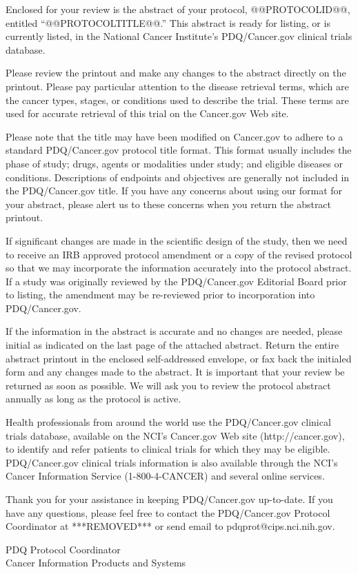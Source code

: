 \documentclass[letterpaper,12pt]{letter}
\begin{document}
Enclosed for your review is the abstract of your protocol, @@PROTOCOLID@@,
entitled ``@@PROTOCOLTITLE@@.''  This abstract is ready for listing, or is
currently listed, in the National Cancer Institute's PDQ/Cancer.gov
clinical trials database.

Please review the printout and make any changes to the abstract directly on
the printout.  Please pay particular attention to the disease retrieval terms,
which are the cancer types, stages, or conditions used to describe the
trial.  These terms are used for accurate retrieval of this trial on the
Cancer.gov Web site.

Please note that the title may have been modified on Cancer.gov to adhere to a
standard PDQ/Cancer.gov protocol title format.  This format usually includes
the phase of study; drugs, agents or modalities under study; and eligible
diseases or conditions.  Descriptions of endpoints and objectives are
generally not included in the PDQ/Cancer.gov title.  If you have any concerns
about using our format for your abstract, please alert us to these concerns
when you return the abstract printout.

If significant changes are made in the scientific design of the study, then we
need to receive an IRB approved protocol amendment or a copy of the revised
protocol so that we may incorporate the information accurately into the
protocol abstract.  If a study was originally reviewed by the PDQ/Cancer.gov
Editorial Board prior to listing, the amendment may be re-reviewed prior to
incorporation into PDQ/Cancer.gov.

If the information in the abstract is accurate and no changes are needed,
please initial as indicated on the last page of the attached abstract.  Return
the entire abstract printout in the enclosed self-addressed envelope, or fax
back the initialed form and any changes made to the abstract.  It is important
that your review be returned as soon as possible.  We will ask you to review
the protocol abstract annually as long as the protocol is active.

Health professionals from around the world use the PDQ/Cancer.gov clinical
trials database, available on the NCI's Cancer.gov Web site
(http://cancer.gov), to identify and refer patients to clinical trials for
which they may be eligible.  PDQ/Cancer.gov clinical trials information is
also available through the NCI's Cancer Information Service (1-800-4-CANCER)
and several online services.

Thank you for your assistance in keeping PDQ/Cancer.gov up-to-date.  If you
have any questions, please feel free to contact the PDQ/Cancer.gov Protocol
Coordinator at ***REMOVED*** or send email to pdqprot@cips.nci.nih.gov.

\vspace{12pt}

PDQ Protocol Coordinator \\
Cancer Information Products and Systems

\vfill
\end{document}
